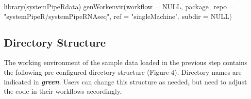 \documentclass[14pt,]{article}
\newcommand{\hlnum}[1]{\textcolor[rgb]{0.816,0.125,0.439}{#1}}%
\newcommand{\hlstr}[1]{\textcolor[rgb]{0.251,0.627,0.251}{#1}}%
\newcommand{\hlstd}[1]{\textcolor[rgb]{0.251,0.251,0.251}{#1}}%
\newenvironment{Shaded}{\begin{myshaded}}{\end{myshaded}}
\newcommand{\ConstantTok}[1]{\hlnum{#1}}
\newcommand{\StringTok}[1]{\hlstr{#1}}
\newcommand{\FunctionTok}[1]{\hlstd{#1}}
\newcommand{\AttributeTok}[1]{{#1}}
\newcommand{\NormalTok}[1]{\hlstd{#1}}
\begin{document}
\begin{Shaded}
\begin{Highlighting}[]
\FunctionTok{library}\NormalTok{(systemPipeRdata)}
\FunctionTok{genWorkenvir}\NormalTok{(}\AttributeTok{workflow =} \ConstantTok{NULL}\NormalTok{, }\AttributeTok{package\_repo =} \StringTok{"systemPipeR/systemPipeRNAseq"}\NormalTok{, }\AttributeTok{ref =} \StringTok{"singleMachine"}\NormalTok{, }
    \AttributeTok{subdir =} \ConstantTok{NULL}\NormalTok{)}
\end{Highlighting}
\end{Shaded}

\hypertarget{directory-structure}{%
\subsection{Directory Structure}\label{directory-structure}}

The working environment of the sample data loaded in the previous step contains
the following pre-configured directory structure (Figure 4). Directory names are indicated
in {\textbf{\emph{green}}}. Users can change this
structure as needed, but need to adjust the code in their workflows
accordingly.
\end{document}

